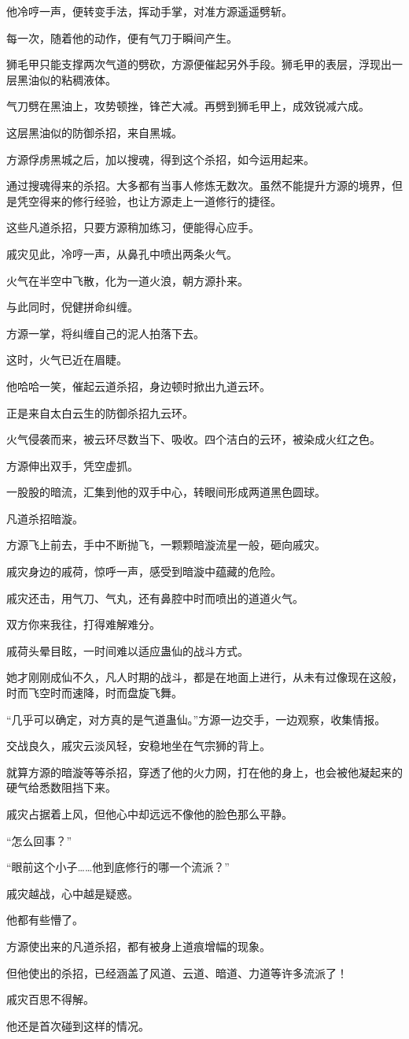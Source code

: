 \begin{this_body}
他冷哼一声，便转变手法，挥动手掌，对准方源遥遥劈斩。

每一次，随着他的动作，便有气刀于瞬间产生。

狮毛甲只能支撑两次气道的劈砍，方源便催起另外手段。狮毛甲的表层，浮现出一层黑油似的粘稠液体。

气刀劈在黑油上，攻势顿挫，锋芒大减。再劈到狮毛甲上，成效锐减六成。

这层黑油似的防御杀招，来自黑城。

方源俘虏黑城之后，加以搜魂，得到这个杀招，如今运用起来。

通过搜魂得来的杀招。大多都有当事人修炼无数次。虽然不能提升方源的境界，但是凭空得来的修行经验，也让方源走上一道修行的捷径。

这些凡道杀招，只要方源稍加练习，便能得心应手。

戚灾见此，冷哼一声，从鼻孔中喷出两条火气。

火气在半空中飞散，化为一道火浪，朝方源扑来。

与此同时，倪健拼命纠缠。

方源一掌，将纠缠自己的泥人拍落下去。

这时，火气已近在眉睫。

他哈哈一笑，催起云道杀招，身边顿时掀出九道云环。

正是来自太白云生的防御杀招九云环。

火气侵袭而来，被云环尽数当下、吸收。四个洁白的云环，被染成火红之色。

方源伸出双手，凭空虚抓。

一股股的暗流，汇集到他的双手中心，转眼间形成两道黑色圆球。

凡道杀招暗漩。

方源飞上前去，手中不断抛飞，一颗颗暗漩流星一般，砸向戚灾。

戚灾身边的戚荷，惊呼一声，感受到暗漩中蕴藏的危险。

戚灾还击，用气刀、气丸，还有鼻腔中时而喷出的道道火气。

双方你来我往，打得难解难分。

戚荷头晕目眩，一时间难以适应蛊仙的战斗方式。

她才刚刚成仙不久，凡人时期的战斗，都是在地面上进行，从未有过像现在这般，时而飞空时而速降，时而盘旋飞舞。

“几乎可以确定，对方真的是气道蛊仙。”方源一边交手，一边观察，收集情报。

交战良久，戚灾云淡风轻，安稳地坐在气宗狮的背上。

就算方源的暗漩等等杀招，穿透了他的火力网，打在他的身上，也会被他凝起来的硬气给悉数阻挡下来。

戚灾占据着上风，但他心中却远远不像他的脸色那么平静。

“怎么回事？”

“眼前这个小子……他到底修行的哪一个流派？”

戚灾越战，心中越是疑惑。

他都有些懵了。

方源使出来的凡道杀招，都有被身上道痕增幅的现象。

但他使出的杀招，已经涵盖了风道、云道、暗道、力道等许多流派了！

戚灾百思不得解。

他还是首次碰到这样的情况。

\end{this_body}

